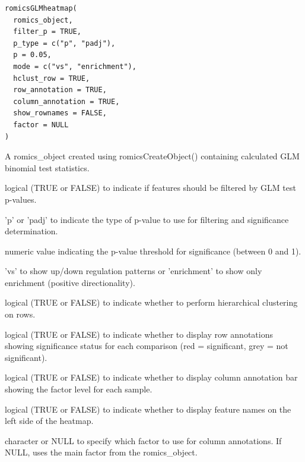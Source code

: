 \documentclass[a4paper]{book}
\begin{document}
%
\begin{Usage}
\begin{verbatim}
romicsGLMheatmap(
  romics_object,
  filter_p = TRUE,
  p_type = c("p", "padj"),
  p = 0.05,
  mode = c("vs", "enrichment"),
  hclust_row = TRUE,
  row_annotation = TRUE,
  column_annotation = TRUE,
  show_rownames = FALSE,
  factor = NULL
)
\end{verbatim}
\end{Usage}
%
\begin{Arguments}
\begin{ldescription}
\item[\code{romics\_object}] A romics\_object created using romicsCreateObject() containing calculated GLM binomial test statistics.

\item[\code{filter\_p}] logical (TRUE or FALSE) to indicate if features should be filtered by GLM test p-values.

\item[\code{p\_type}] 'p' or 'padj' to indicate the type of p-value to use for filtering and significance determination.

\item[\code{p}] numeric value indicating the p-value threshold for significance (between 0 and 1).

\item[\code{mode}] 'vs' to show up/down regulation patterns or 'enrichment' to show only enrichment (positive directionality).

\item[\code{hclust\_row}] logical (TRUE or FALSE) to indicate whether to perform hierarchical clustering on rows.

\item[\code{row\_annotation}] logical (TRUE or FALSE) to indicate whether to display row annotations showing significance status for each comparison (red = significant, grey = not significant).

\item[\code{column\_annotation}] logical (TRUE or FALSE) to indicate whether to display column annotation bar showing the factor level for each sample.

\item[\code{show\_rownames}] logical (TRUE or FALSE) to indicate whether to display feature names on the left side of the heatmap.

\item[\code{factor}] character or NULL to specify which factor to use for column annotations. If NULL, uses the main factor from the romics\_object.
\end{ldescription}
\end{Arguments}
\end{document}

